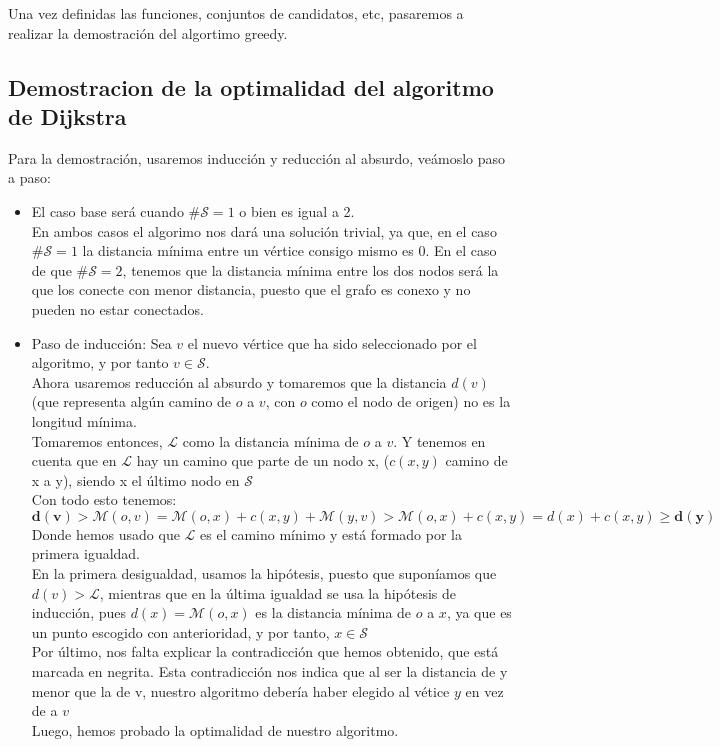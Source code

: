 \documentclass[11pt,openany]{book}
\begin{document}
Una vez definidas las funciones, conjuntos de candidatos, etc,  pasaremos a realizar la demostración del algortimo greedy.

\subsection{Demostracion de la optimalidad del algoritmo de Dijkstra}
Para la demostración, usaremos inducción y reducción al absurdo, veámoslo paso a paso:
\begin{itemize}
      \item El caso base será cuando \#$\mathscr{S}=1$ o bien es igual a 2.\\
            En ambos casos el algorimo nos dará una solución trivial, ya que, en el caso \#$\mathscr{S}=1$ la distancia mínima entre un vértice consigo mismo es 0.
            En el caso de que \#$\mathscr{S}=2$, tenemos que la distancia mínima entre los dos nodos será la que los conecte con menor distancia, puesto que el grafo es conexo y no pueden no estar conectados.
      \item Paso de inducción:
            Sea $v$ el nuevo vértice que ha sido seleccionado por el algoritmo, y por tanto $v\in \mathscr{S}$.\\
            Ahora usaremos reducción al absurdo y tomaremos que la distancia $d(v)$ (que representa algún camino de $o$ a $v$, con $o$ como el nodo de origen) no es la longitud mínima.\\
            Tomaremos entonces, $\mathscr{L}$ como la distancia mínima de $o$ a $v$. Y tenemos en cuenta que en $\mathscr{L}$ hay un camino que parte de un nodo x, ($c(x,y)$ camino de x a y), siendo x el último nodo en $\mathscr{S}$\\
            Con todo esto tenemos:
            \begin{equation*}
                  \mathbf{d(v)}\bm{>}\mathscr{M}(o,v)=\mathscr{M}(o,x)+c(x,y)+\mathscr{M}(y,v) > \mathscr{M}(o,x)+c(x,y)= d(x)+c(x,y)\geq\mathbf{d(y)}
            \end{equation*}
            Donde hemos usado que $\mathscr{L}$ es el camino mínimo y está formado por la primera igualdad.\\
            En la primera desigualdad, usamos la hipótesis, puesto que suponíamos que $d(v)>\mathscr{L}$, mientras que en la última igualdad
            se usa la hipótesis de inducción, pues $d(x)=\mathscr{M}(o,x)$ es la distancia mínima de $o$ a $x$, ya que es un punto escogido con anterioridad, y por tanto, $x\in \mathscr{S}$\\
            Por último, nos falta explicar la contradicción que hemos obtenido, que está marcada en negrita.
            Esta contradicción nos indica que al ser la distancia de y menor que la de v, nuestro algoritmo debería haber elegido al vétice $y$ en vez de a $v$\\
            Luego, hemos probado la optimalidad de nuestro algoritmo.

\end{itemize}
\end{document}
